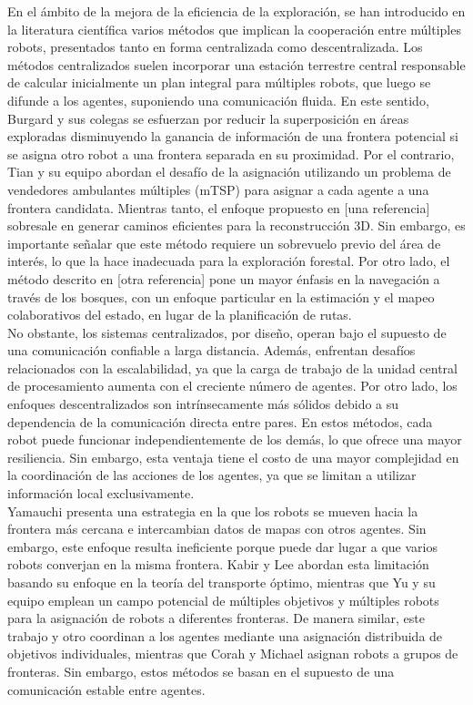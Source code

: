 \documentclass[sigconf]{acmart}
\begin{document}
En el ámbito de la mejora de la eficiencia de la exploración, se han introducido en la literatura científica varios métodos que implican la cooperación entre múltiples robots, presentados tanto en forma centralizada como descentralizada. Los métodos centralizados suelen incorporar una estación terrestre central responsable de calcular inicialmente un plan integral para múltiples robots, que luego se difunde a los agentes, suponiendo una comunicación fluida. En este sentido, Burgard y sus colegas se esfuerzan por reducir la superposición en áreas exploradas disminuyendo la ganancia de información de una frontera potencial si se asigna otro robot a una frontera separada en su proximidad. Por el contrario, Tian y su equipo abordan el desafío de la asignación utilizando un problema de vendedores ambulantes múltiples (mTSP) para asignar a cada agente a una frontera candidata. Mientras tanto, el enfoque propuesto en [una referencia] sobresale en generar caminos eficientes para la reconstrucción 3D. Sin embargo, es importante señalar que este método requiere un sobrevuelo previo del área de interés, lo que la hace inadecuada para la exploración forestal. Por otro lado, el método descrito en [otra referencia] pone un mayor énfasis en la navegación a través de los bosques, con un enfoque particular en la estimación y el mapeo colaborativos del estado, en lugar de la planificación de rutas.\\

No obstante, los sistemas centralizados, por diseño, operan bajo el supuesto de una comunicación confiable a larga distancia. Además, enfrentan desafíos relacionados con la escalabilidad, ya que la carga de trabajo de la unidad central de procesamiento aumenta con el creciente número de agentes. Por otro lado, los enfoques descentralizados son intrínsecamente más sólidos debido a su dependencia de la comunicación directa entre pares. En estos métodos, cada robot puede funcionar independientemente de los demás, lo que ofrece una mayor resiliencia. Sin embargo, esta ventaja tiene el costo de una mayor complejidad en la coordinación de las acciones de los agentes, ya que se limitan a utilizar información local exclusivamente.\\

Yamauchi presenta una estrategia en la que los robots se mueven hacia la frontera más cercana e intercambian datos de mapas con otros agentes. Sin embargo, este enfoque resulta ineficiente porque puede dar lugar a que varios robots converjan en la misma frontera. Kabir y Lee abordan esta limitación basando su enfoque en la teoría del transporte óptimo, mientras que Yu y su equipo emplean un campo potencial de múltiples objetivos y múltiples robots para la asignación de robots a diferentes fronteras. De manera similar, este trabajo y otro coordinan a los agentes mediante una asignación distribuida de objetivos individuales, mientras que Corah y Michael asignan robots a grupos de fronteras. Sin embargo, estos métodos se basan en el supuesto de una comunicación estable entre agentes.\\
\end{document}

